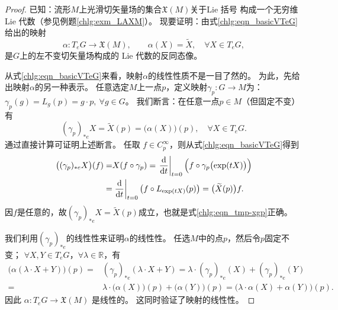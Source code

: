 \begin{proof}
    已知：流形$M$上光滑切矢量场的集合$\mathfrak{X}(M)$关于Lie 括号
    构成一个无穷维 Lie 代数（参见例题\ref{chlg:exm_LAXM}）。
    现要证明：由式\eqref{chlg:eqn_basicVTeG}给出的映射
    \begin{equation}
        \alpha: T_e G \rightarrow \mathfrak{X}(M),\qquad
        \alpha(X)=\widetilde{X}, \quad \forall X \in T_e G,
    \end{equation}
    是$G$上的左不变切矢量场构成的 Lie 代数的反同态像。

    从式\eqref{chlg:eqn_basicVTeG}来看，映射$\alpha$的线性性质不是一目了然的。
    为此，先给出映射$\alpha$的另一种表示。
    任意选定$M$上一点$p$，定义映射$\gamma_p: G \rightarrow M$为：
    $\gamma_p(g)=L_g(p)=g\cdot p, \ \forall g \in G $。
    我们断言：在任意一点$p \in M$（但固定不变）有
    \begin{equation}\label{chlg:eqn_tmp-xgp}
        (\gamma_p)_{*e} X =\widetilde{X}(p)=\bigl(\alpha(X)\bigr)(p), \quad \forall X \in T_e G .
    \end{equation}
    通过直接计算可证明上述断言。
    任取 $f \in C_p^{\infty}$，则从式\eqref{chlg:eqn_basicVTeG}得到
    \begin{align*}
        \bigl((\gamma_p)_{*e} X\bigr)(f)=& X(f \circ \gamma_p)
        = \left.\frac{\dd }{\dd t}\right|_{t=0} \Bigl(f \circ \gamma_p\bigl(\exp (t X)\bigr)\Bigr) \\
        = & \left.\frac{\dd }{\dd t}\right|_{t=0}\left(f \circ L_{\exp (t  X)}(p)\right)
        =  \bigl(\widetilde{X}(p)\bigr) f.
    \end{align*}
    因$f$是任意的，故$(\gamma_p)_{*e} X=\widetilde{X}(p)$成立，也就是式\eqref{chlg:eqn_tmp-xgp}正确。

    我们利用$(\gamma_p)_{*e}$的线性性来证明$\alpha$的线性性。
    任选$M$中的点$p$，然后令$p$固定不变；
    $\forall X, Y \in T_e G$，$\forall \lambda \in \mathbb{R}$，有
    \begin{align*}
        \bigl(\alpha(\lambda \cdot X+Y)\bigr)(p)=& (\gamma_p)_{*e}(\lambda \cdot X+Y)
        =  \lambda \cdot (\gamma_p)_{*e}(X)+(\gamma_p)_{*e}(Y) \\
        = & \lambda \cdot \bigl(\alpha(X)\bigr)(p)+\bigl(\alpha(Y)\bigr)(p)
        =  \bigl(\lambda \cdot \alpha(X)+\alpha(Y)\bigr)(p).
    \end{align*}
    因此 $\alpha: T_e G \rightarrow \mathfrak{X}(M)$ 是线性的。
    这同时验证了映射的线性性。


\end{proof}
